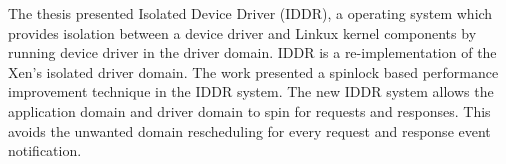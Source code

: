 The thesis presented Isolated Device Driver (IDDR), a operating system which provides isolation between a device driver and Linkux kernel components by running device driver in the driver domain. IDDR is a re-implementation of the Xen's isolated driver domain. The work presented a spinlock based performance improvement technique in the IDDR system. The new IDDR system allows the application domain and driver domain to spin for requests and responses. This avoids the unwanted domain rescheduling for every request and response event notification. 